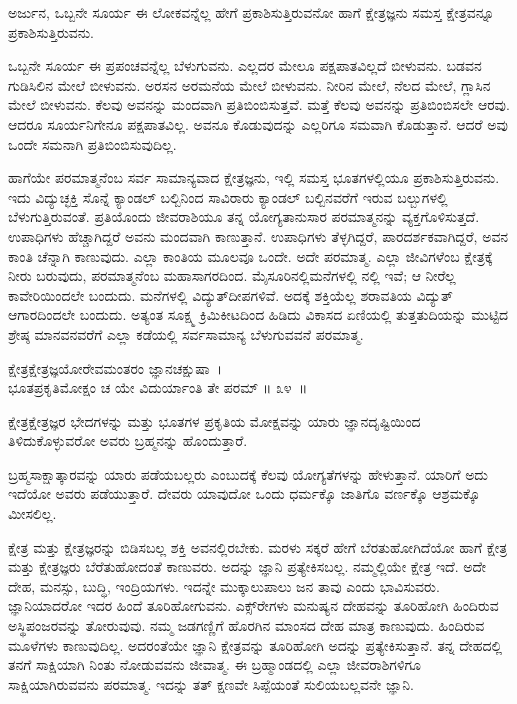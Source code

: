 \begin{artha}
ಅರ್ಜುನ, ಒಬ್ಬನೇ ಸೂರ್ಯ ಈ ಲೋಕವನ್ನೆಲ್ಲ ಹೇಗೆ ಪ್ರಕಾಶಿಸುತ್ತಿರುವನೋ ಹಾಗೆ ಕ್ಷೇತ್ರಜ್ಞನು ಸಮಸ್ತ ಕ್ಷೇತ್ರವನ್ನೂ ಪ್ರಕಾಶಿಸುತ್ತಿರುವನು.
\end{artha}

ಒಬ್ಬನೇ ಸೂರ್ಯ ಈ ಪ್ರಪಂಚವನ್ನೆಲ್ಲ ಬೆಳುಗುವನು. ಎಲ್ಲದರ ಮೇಲೂ ಪಕ್ಷಪಾತವಿಲ್ಲದೆ ಬೀಳುವನು. ಬಡವನ ಗುಡಿಸಿಲಿನ ಮೇಲೆ ಬೀಳುವನು. ಅರಸನ ಅರಮನೆಯ ಮೇಲೆ ಬೀಳುವನು. ನೀರಿನ ಮೇಲೆ, ನೆಲದ ಮೇಲೆ, ಗ್ಲಾಸಿನ ಮೇಲೆ ಬೀಳುವನು. ಕೆಲವು ಅವನನ್ನು ಮಂದವಾಗಿ ಪ್ರತಿಬಿಂಬಿಸುತ್ತವೆ. ಮತ್ತೆ ಕೆಲವು ಅವನನ್ನು ಪ್ರತಿಬಿಂಬಿಸಲೇ ಆರವು. ಆದರೂ ಸೂರ್ಯನಿಗೇನೂ ಪಕ್ಷಪಾತವಿಲ್ಲ. ಅವನೂ ಕೊಡುವುದನ್ನು ಎಲ್ಲರಿಗೂ ಸಮವಾಗಿ ಕೊಡುತ್ತಾನೆ. ಆದರೆ ಅವು ಒಂದೇ ಸಮನಾಗಿ ಪ್ರತಿಬಿಂಬಿಸುವುದಿಲ್ಲ.

ಹಾಗೆಯೇ ಪರಮಾತ್ಮನೆಂಬ ಸರ್ವ ಸಾಮಾನ್ಯವಾದ ಕ್ಷೇತ್ರಜ್ಞನು, ಇಲ್ಲಿ ಸಮಸ್ತ ಭೂತ\-ಗಳಲ್ಲಿಯೂ ಪ್ರಕಾಶಿಸುತ್ತಿರುವನು. ಇದು ವಿದ್ಯುಚ್ಛಕ್ತಿ ಸೊನ್ನೆ ಕ್ಯಾಂಡಲ್ ಬಲ್ಬಿನಿಂದ ಸಾವಿರಾರು ಕ್ಯಾಂಡಲ್ ಬಲ್ಬಿನವರೆಗೆ ಇರುವ ಬಲ್ಬುಗಳಲ್ಲಿ ಬೆಳುಗುತ್ತಿರುವಂತೆ. ಪ್ರತಿಯೊಂದು ಜೀವರಾಶಿಯೂ ತನ್ನ ಯೋಗ್ಯತಾನುಸಾರ ಪರಮಾತ್ಮನನ್ನು ವ್ಯಕ್ತಗೊಳಿಸುತ್ತದೆ. ಉಪಾಧಿಗಳು ಹೆಚ್ಚಾಗಿದ್ದರೆ ಅವನು ಮಂದವಾಗಿ ಕಾಣುತ್ತಾನೆ. ಉಪಾಧಿಗಳು ತೆಳ್ಳಗಿದ್ದರೆ, ಪಾರದರ್ಶಕವಾಗಿದ್ದರೆ, ಅವನ ಕಾಂತಿ ಚೆನ್ನಾಗಿ ಕಾಣುವುದು. ಎಲ್ಲಾ ಕಾಂತಿಯ ಮೂಲವೂ ಒಂದೇ. ಅದೇ ಪರಮಾತ್ಮ. ಎಲ್ಲಾ ಜೀವಿಗಳೆಂಬ ಕ್ಷೇತ್ರಕ್ಕೆ ನೀರು ಬರುವುದು, ಪರಮಾತ್ಮನೆಂಬ ಮಹಾಸಾಗರದಿಂದ. ಮೈಸೂರಿನಲ್ಲಿ\break ಮನೆಗಳಲ್ಲಿ ನಲ್ಲಿ ಇವೆ; ಆ ನೀರೆಲ್ಲ ಕಾವೇರಿಯಿಂದಲೇ ಬಂದುದು. ಮನೆಗಳಲ್ಲಿ ವಿದ್ಯುತ್​ದೀಪ\-ಗಳಿವೆ. ಅದಕ್ಕೆ ಶಕ್ತಿಯೆಲ್ಲ ಶರಾವತಿಯ ವಿದ್ಯುತ್ ಆಗಾರದಿಂದಲೇ ಬಂದುದು. ಅತ್ಯಂತ ಸೂಕ್ಷ್ಮ ಕ್ರಿಮಿಕೀಟದಿಂದ ಹಿಡಿದು ವಿಕಾಸದ ಏಣಿಯಲ್ಲಿ ತುತ್ತತುದಿಯನ್ನು ಮುಟ್ಟಿದ ಶ್ರೇಷ್ಠ ಮಾನವನವರೆಗೆ ಎಲ್ಲಾ ಕಡೆಯಲ್ಲಿ ಸರ್ವಸಾಮಾನ್ಯ ಬೆಳುಗುವವನೆ ಪರಮಾತ್ಮ.

\begin{shloka}
ಕ್ಷೇತ್ರಕ್ಷೇತ್ರಜ್ಞಯೋರೇವಮಂತರಂ ಜ್ಞಾನಚಕ್ಷುಷಾ~।\\ಭೂತಪ್ರಕೃತಿಮೋಕ್ಷಂ ಚ ಯೇ ವಿದುರ್ಯಾಂತಿ ತೇ ಪರಮ್ \hfill॥ ೩೪~॥
\end{shloka}

\begin{artha}
ಕ್ಷೇತ್ರಕ್ಷೇತ್ರಜ್ಞರ ಭೇದಗಳನ್ನು ಮತ್ತು ಭೂತಗಳ ಪ್ರಕೃತಿಯ ಮೋಕ್ಷವನ್ನು ಯಾರು ಜ್ಞಾನದೃಷ್ಟಿಯಿಂದ ತಿಳಿದುಕೊಳ್ಳುವರೋ ಅವರು ಬ್ರಹ್ಮನನ್ನು ಹೊಂದುತ್ತಾರೆ.
\end{artha}

ಬ್ರಹ್ಮಸಾಕ್ಷಾತ್ಕಾರವನ್ನು ಯಾರು ಪಡೆಯಬಲ್ಲರು ಎಂಬುದಕ್ಕೆ ಕೆಲವು ಯೋಗ್ಯತೆಗಳನ್ನು ಹೇಳುತ್ತಾನೆ. ಯಾರಿಗೆ ಅದು ಇದೆಯೋ ಅವರು ಪಡೆಯುತ್ತಾರೆ. ದೇವರು ಯಾವುದೋ ಒಂದು ಧರ್ಮಕ್ಕೊ ಜಾತಿಗೊ ವರ್ಣಕ್ಕೊ ಆಶ್ರಮಕ್ಕೊ ಮೀಸಲಿಲ್ಲ.

ಕ್ಷೇತ್ರ ಮತ್ತು ಕ್ಷೇತ್ರಜ್ಞರನ್ನು ಬಿಡಿಸಬಲ್ಲ ಶಕ್ತಿ ಅವನಲ್ಲಿರಬೇಕು. ಮರಳು ಸಕ್ಕರೆ ಹೇಗೆ ಬೆರತುಹೋಗಿದೆಯೋ ಹಾಗೆ ಕ್ಷೇತ್ರ ಮತ್ತು ಕ್ಷೇತ್ರಜ್ಞರು ಬೆರೆತುಹೋದಂತೆ ಕಾಣುವರು. ಅದನ್ನು ಜ್ಞಾನಿ ಪ್ರತ್ಯೇಕಿಸಬಲ್ಲ. ನಮ್ಮಲ್ಲಿಯೇ ಕ್ಷೇತ್ರ ಇದೆ. ಅದೇ ದೇಹ, ಮನಸ್ಸು, ಬುದ್ಧಿ, ಇಂದ್ರಿಯಗಳು. ಇದನ್ನೇ ಮುಕ್ಕಾಲುಪಾಲು ಜನ ತಾವು ಎಂದು ಭಾವಿಸುವರು. ಜ್ಞಾನಿಯಾದರೋ ಇದರ ಹಿಂದೆ ತೂರಿಹೋಗುವನು. ಎಕ್ಸ್​ರೇಗಳು ಮನುಷ್ಯನ ದೇಹವನ್ನು ತೂರಿಹೋಗಿ ಹಿಂದಿರುವ ಅಸ್ಥಿಪಂಜರವನ್ನು ತೋರುವುವು. ನಮ್ಮ ಜಡಗಣ್ಣಿಗೆ ಹೊರಗಿನ ಮಾಂಸದ ದೇಹ ಮಾತ್ರ ಕಾಣುವುದು. ಹಿಂದಿರುವ ಮೂಳೆಗಳು ಕಾಣುವುದಿಲ್ಲ. ಅದರಂತೆಯೇ ಜ್ಞಾನಿ ಕ್ಷೇತ್ರವನ್ನು ತೂರಿಹೋಗಿ ಅದನ್ನು ಪ್ರತ್ಯೇಕಿಸುತ್ತಾನೆ. ತನ್ನ ದೇಹದಲ್ಲಿ ತನಗೆ ಸಾಕ್ಷಿಯಾಗಿ ನಿಂತು ನೋಡುವವನು ಜೀವಾತ್ಮ. ಈ ಬ್ರಹ್ಮಾಂಡದಲ್ಲಿ ಎಲ್ಲಾ ಜೀವರಾಶಿಗಳಿಗೂ ಸಾಕ್ಷಿಯಾಗಿರುವವನು ಪರಮಾತ್ಮ. ಇದನ್ನು ತತ್ ಕ್ಷಣವೇ ಸಿಪ್ಪೆಯಂತೆ ಸುಲಿಯಬಲ್ಲವನೇ ಜ್ಞಾನಿ.


